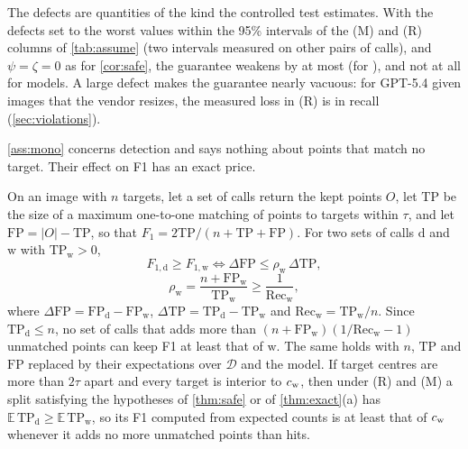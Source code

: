 The defects are quantities of the kind the controlled test estimates. With the defects set to the worst values within the 95\% intervals of the (M) and (R) columns of \cref{tab:assume} (two intervals measured on other pairs of calls), and $\psi = \zeta = 0$ as for \cref{cor:safe}, the guarantee weakens by at most \XrobMax{} (for \XrobMaxModel), and not at all for \XrobZero{} models. A large defect makes the guarantee nearly vacuous: for GPT-5.4 given images that the vendor resizes, the measured loss in (R) is \XtcViolDpos{} in recall (\cref{sec:violations}).

\cref{ass:mono} concerns detection and says nothing about points that match no target. Their effect on F1 has an exact price.

\begin{proposition}[F1 of a split]
\label{prop:f1}
On an image with $n$ targets, let a set of calls return the kept points $O$, let $\mathrm{TP}$ be the size of a maximum one-to-one matching of points to targets within $\tau$, and let $\mathrm{FP} = |O| - \mathrm{TP}$, so that $F_1 = 2\mathrm{TP}/(n + \mathrm{TP} + \mathrm{FP})$. For two sets of calls $\mathrm{d}$ and $\mathrm{w}$ with $\mathrm{TP}_{\mathrm{w}} > 0$,
\[
F_{1,\mathrm{d}} \ge F_{1,\mathrm{w}} \iff \Delta\mathrm{FP} \le \rho_{\mathrm{w}}\,\Delta\mathrm{TP},
\]
\[
\rho_{\mathrm{w}} = \frac{n + \mathrm{FP}_{\mathrm{w}}}{\mathrm{TP}_{\mathrm{w}}} \ge \frac{1}{\mathrm{Rec}_{\mathrm{w}}},
\]
where $\Delta\mathrm{FP} = \mathrm{FP}_{\mathrm{d}} - \mathrm{FP}_{\mathrm{w}}$, $\Delta\mathrm{TP} = \mathrm{TP}_{\mathrm{d}} - \mathrm{TP}_{\mathrm{w}}$ and $\mathrm{Rec}_{\mathrm{w}} = \mathrm{TP}_{\mathrm{w}}/n$. Since $\mathrm{TP}_{\mathrm{d}} \le n$, no set of calls that adds more than $(n + \mathrm{FP}_{\mathrm{w}})(1/\mathrm{Rec}_{\mathrm{w}} - 1)$ unmatched points can keep F1 at least that of $\mathrm{w}$. The same holds with $n$, $\mathrm{TP}$ and $\mathrm{FP}$ replaced by their expectations over $\mathcal{D}$ and the model. If target centres are more than $2\tau$ apart and every target is interior to $c_{\mathrm{w}}$, then under (R) and (M) a split satisfying the hypotheses of \cref{thm:safe} or of \cref{thm:exact}(a) has $\mathbb{E}\,\mathrm{TP}_{\mathrm{d}} \ge \mathbb{E}\,\mathrm{TP}_{\mathrm{w}}$, so its F1 computed from expected counts is at least that of $c_{\mathrm{w}}$ whenever it adds no more unmatched points than hits.
\end{proposition}


